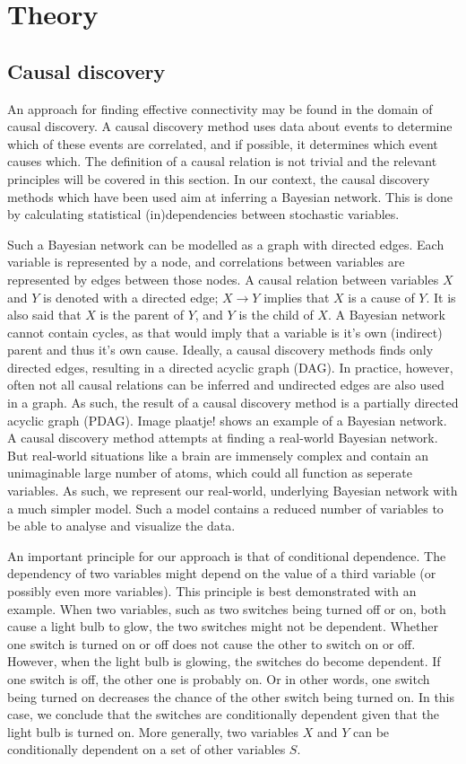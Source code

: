 \documentclass[a4paper, 10pt, english, twocolumn]{article}
\begin{document}
\section{Theory}

\subsection{Causal discovery}
An approach for finding effective connectivity may be found in the domain of causal discovery.
A causal discovery method uses data about events to determine which of these events are correlated, and if possible, it determines which event causes which.
The definition of a causal relation is not trivial \cite{?} and the relevant principles will be covered in this section.
In our context, the causal discovery methods which have been used aim at inferring a Bayesian network.
This is done by calculating statistical (in)dependencies between stochastic variables.

Such a Bayesian network can be modelled as a graph with directed edges.
Each variable is represented by a node, and correlations between variables are represented by edges between those nodes.
A causal relation between variables $X$ and $Y$ is denoted with a directed edge; $X \rightarrow Y$ implies that $X$ is a cause of $Y$.
It is also said that $X$ is the parent of $Y$, and $Y$ is the child of $X$.
A Bayesian network cannot contain cycles, as that would imply that a variable is it's own (indirect) parent and thus it's own cause.
Ideally, a causal discovery methods finds only directed edges, resulting in a directed acyclic graph (DAG).
In practice, however, often not all causal relations can be inferred and undirected edges are also used in a graph.
As such, the result of a causal discovery method is a partially directed acyclic graph (PDAG).
Image {plaatje!} shows an example of a Bayesian network.
A causal discovery method attempts at finding a real-world Bayesian network.
But real-world situations like a brain are immensely complex and contain an unimaginable large number of atoms, which could all function as seperate variables.
As such, we represent our real-world, underlying Bayesian network with a much simpler model.
Such a model contains a reduced number of variables to be able to analyse and visualize the data.

An important principle for our approach is that of conditional dependence.
The dependency of two variables might depend on the value of a third variable (or possibly even more variables).
This principle is best demonstrated with an example.
When two variables, such as two switches being turned off or on, both cause a light bulb to glow, the two switches might not be dependent.
Whether one switch is turned on or off does not cause the other to switch on or off.
However, when the light bulb is glowing, the switches do become dependent.
If one switch is off, the other one is probably on.
Or in other words, one switch being turned on decreases the chance of the other switch being turned on.
In this case, we conclude that the switches are conditionally dependent given that the light bulb is turned on.
More generally, two variables $X$ and $Y$ can be conditionally dependent on a set of other variables $S$. %
\end{document}
